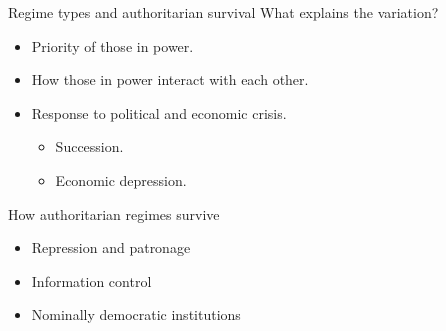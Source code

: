 \documentclass[10pt]{beamer}
\begin{document}
\begin{frame}{Regime types and authoritarian survival}
What explains the variation?
	\vspace{0.1cm}
	\pause
	\begin{itemize}
	\item Priority of those in power.
	\item How those in power interact with each other.
	\item Response to political and economic crisis.
		\pause
		\vspace{0.1cm}
		\begin{itemize}
		\item Succession.
		\item Economic depression.
		\end{itemize}
	\end{itemize}
\end{frame}

\begin{frame}{How authoritarian regimes survive}
	\begin{itemize}
		\item Repression and patronage
		\item Information control
		\item Nominally democratic institutions
	\end{itemize}
\end{frame}
\end{document}
